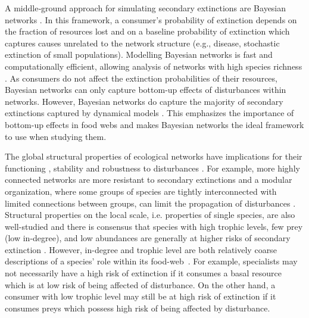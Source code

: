 \documentclass[12pt]{article}
\begin{document}
\begin{spacing}{2.0}
    
    A middle‐ground approach for simulating secondary extinctions are Bayesian networks \citep{Eklof2013}. In this framework, a consumer's probability of extinction depends on the fraction of resources lost and on a baseline probability of extinction which captures causes unrelated to the network structure (e.g., disease, stochastic extinction of small populations). Modelling Bayesian networks is fast and computationally efficient, allowing analysis of networks with high species richness \citep{Haussler2020}. 
    As consumers do not affect the extinction probabilities of their resources, Bayesian networks can only capture bottom-up effects of disturbances within networks. However, Bayesian networks do capture the majority of secondary extinctions captured by dynamical models \citep{Eklof2013}.
    This emphasizes the importance of bottom-up effects in food webs and makes Bayesian networks the ideal framework to use when studying them.  

    The global structural properties of ecological networks have implications for their functioning \citep{Petchey2002}, stability \citep{Allesina2012} and robustness to disturbances \citep{Dunne2002d, Eklof2006}. For example, more highly connected networks are more resistant to secondary extinctions \citep{Dunne2002d, Eklof2006} and a modular organization, where some groups of species are tightly interconnected with limited connections between groups, can limit the propagation of disturbances \citep{}.
    Structural properties on the local scale, i.e. properties of single species, are also well-studied and there is consensus that species with high trophic levels, few prey (low in-degree), and low abundances are generally at higher risks of secondary extinction \citep{binzer2011susceptibility}. However, in-degree and trophic level are both relatively coarse descriptions of a species' role within its food-web~\citep{Cirtwill2018FoodWebs}. 
    For example, specialists may not necessarily have a high risk of extinction if it consumes a basal resource which is at low risk of being affected of disturbance. On the other hand, a consumer with low trophic level may still be at high risk of extinction if it consumes preys which possess high risk of being affected by disturbance. 
    

\end{spacing}
\end{document}
